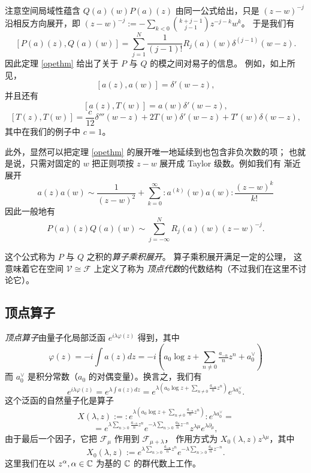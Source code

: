 注意空间局域性蕴含 $Q(a)(w)P(a)(z)$ 由同一公式给出，只是
$(z-w)^{-j}$ 沿相反方向展开，即
$(z-w)^{-j}:=-\sum_{k<0} \binom{k+j-1}{j-1}z^{-j-k}w^k$。
于是我们有
$$
[P(a)(z),Q(a)(w)]=\sum_{j=1}^{N}\frac{1}{(j-1)!}R_j(a)(w)\delta^{(j-1)}(w-z).
$$
因此定理 \ref{opethm} 给出了关于 $P$ 与 $Q$ 的模之间对易子的信息。
例如，如上所见，
$$
[a(z),a(w)]=\delta'(w-z), 
$$
并且还有
$$
[a(z),T(w)]=a(w)\delta'(w-z),
$$
$$
[T(z),T(w)]=\frac{c}{12}\delta'''(w-z)+2T(w)\delta'(w-z)+T'(w)\delta(w-z),
$$
其中在我们的例子中 $c=1$。

此外，显然可以把定理 \ref{opethm} 的展开唯一地延续到也包含非负次数的项；
也就是说，只需对固定的 $w$ 把正则项按 $z-w$ 展开成 Taylor 级数。例如我们有
渐近展开
$$
a(z)a(w)\sim \frac{1}{(z-w)^2}+\sum_{k=0}^\infty :a^{(k)}(w)a(w):\frac{(z-w)^k}{k!}
$$
因此一般地有
$$
P(a)(z)Q(a)(w)\sim \sum_{j=-\infty}^{N}R_j(a)(w)(z-w)^{-j}.
$$

这个公式称为 $P$ 与 $Q$ 之积的\emph{算子乘积展开}。
算子乘积展开满足一定的公理，
这意味着它在空间 $\mathcal V\cong \mathcal F$ 上定义了称为
\emph{顶点代数}的代数结构（不过我们在这里不讨论它）。


\subsection{顶点算子} 

\emph{顶点算子}由量子化局部泛函 $e^{i\lambda \varphi(z)}$ 得到，其中
$$
\varphi(z)=-i\int a(z)dz=-i(a_0\log z+\sum_{n\ne 0}\tfrac{a_{-n}}{n}z^{n}+a_0^\vee)
$$
而 $a_0^\vee$ 是积分常数（$a_0$ 的对偶变量）。换言之，我们有
$$
e^{i\lambda \varphi(z)}=e^{\lambda \int a(z)dz}=e^{\lambda(a_0\log z+\sum_{n\ne 0}\frac{a_{-n}}{n}z^{n})}e^{\lambda a_0^\vee}.
$$
这个泛函的自然量子化是算子
$$
X(\lambda,z):=:e^{\lambda(a_0\log z+\sum_{n\ne 0}\frac{a_{-n}}{n}z^n)}:e^{\lambda a_0^\vee}=
$$
$$
=e^{\lambda\sum_{n>0}\frac{a_{-n}}{n}z^n}e^{-\lambda\sum_{n>0}\frac{a_{n}}{n}z^{-n}}
z^{\lambda\mu} e^{\lambda\partial_\mu},
$$
由于最后一个因子，它把 $\mathcal F_\mu$ 作用到 $\mathcal F_{\mu+\lambda}$，
作用方式为 $X_0(\lambda,z)z^{\lambda\mu}$，其中
$$
X_0(\lambda,z):=e^{\lambda\sum_{n>0}\frac{a_{-n}}{n}z^n}e^{-\lambda\sum_{n>0}\frac{a_{n}}{n}z^{-n}}.
$$
这里我们在以 $z^\alpha,\alpha\in \Bbb C$ 为基的 $\Bbb C$ 的群代数上工作。

